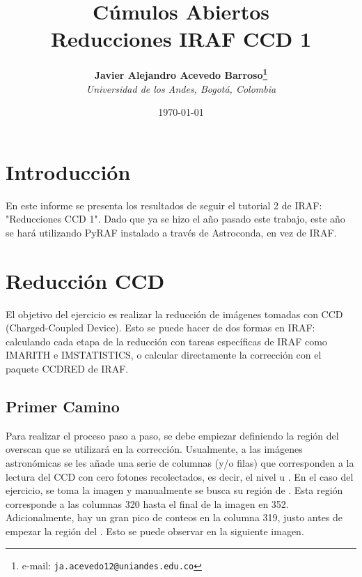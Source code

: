 \documentclass[12pt]{article}
\begin{document}
\title{Cúmulos Abiertos \\ Reducciones IRAF CCD 1}

\author{
\textbf{Javier Alejandro Acevedo Barroso\thanks{e-mail: \texttt{ja.acevedo12@uniandes.edu.co}}}\\
\textit{Universidad de los Andes, Bogotá, Colombia}\\
 }%

\date{\today}
\maketitle %


\normalsize
\newpage
\section{Introducción}
En este informe se presenta los resultados de seguir el tutorial 2 de IRAF: "Reducciones CCD 1".
Dado que ya se hizo el año pasado este trabajo, este año se hará utilizando PyRAF instalado a través de Astroconda, en vez de IRAF.

\section{Reducción CCD}

El objetivo del ejercicio es realizar la reducción de imágenes tomadas con CCD (Charged-Coupled Device). Esto se puede hacer de dos formas en IRAF: calculando cada etapa de la reducción con tareas específicas de IRAF como IMARITH e IMSTATISTICS, o calcular directamente la corrección con el paquete CCDRED de IRAF.



\subsection{Primer Camino}
Para realizar el proceso paso a paso, se debe empiezar definiendo la región del overscan que se utilizará en la corrección. Usualmente, a las imágenes astronómicas se les añade una serie de columnas (y/o filas) que corresponden a la lectura del CCD con cero fotones recolectados, es decir, el nivel  u \cite{handbookCCD}. En el caso del ejercicio, se toma la imagen  y manualmente se busca su región de  . Esta región corresponde a las columnas 320 hasta el final de la imagen en 352. Adicionalmente, hay un gran pico de conteos en la columna 319, justo antes de empezar la región del  . Esto se puede observar en la siguiente imagen. \\
\end{document}
